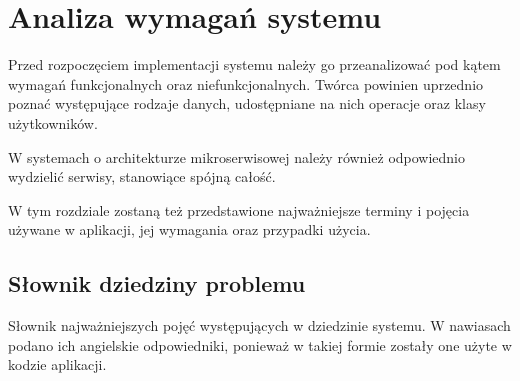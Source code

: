 \clearpage %

\section{Analiza wymagań systemu}

Przed rozpoczęciem implementacji systemu należy go przeanalizować pod kątem wymagań funkcjonalnych oraz niefunkcjonalnych. Twórca powinien uprzednio poznać występujące rodzaje danych, udostępniane na nich operacje oraz klasy użytkowników.

W systemach o architekturze mikroserwisowej należy również odpowiednio wydzielić serwisy, stanowiące spójną całość.

W tym rozdziale zostaną też przedstawione najważniejsze terminy i pojęcia używane w aplikacji, jej wymagania oraz przypadki użycia.

\subsection{Słownik dziedziny problemu}

Słownik najważniejszych pojęć występujących w dziedzinie systemu. W nawiasach podano ich angielskie odpowiedniki, ponieważ w takiej formie zostały one użyte w kodzie aplikacji.

